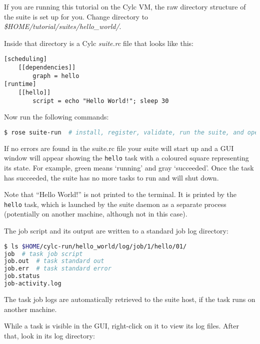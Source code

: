 \begin{shaded*}

If you are running this tutorial on the Cylc VM, the raw directory structure of the suite is set up for you. Change directory to {\em \$HOME/tutorial/suites/hello\_world/}. 

Inside that directory is a Cylc {\em suite.rc} file that looks like this:

\begin{lstlisting}[language=suiterc]
[scheduling]
    [[dependencies]]
        graph = hello
[runtime]
    [[hello]]
        script = echo "Hello World!"; sleep 30
\end{lstlisting}

Now run the following commands:

\begin{lstlisting}[language=bash]
$ rose suite-run  # install, register, validate, run the suite, and open the GUI
\end{lstlisting}

If no errors are found in the suite.rc file your suite will start up and a
GUI window will appear showing the \lstinline{hello} task with a coloured
square representing its state. For example, green means `running' and gray
`succeeded'.  Once the task has succeeded, the suite has no more tasks to run
and will shut down.

Note that ``Hello World!'' is not printed to the terminal. It is printed by 
the \lstinline=hello= task, which is launched by the suite daemon as a separate
process (potentially on another machine, although not in this case).


The job script and its output are written to a standard job log directory:

\begin{lstlisting}[language=bash]
$ ls $HOME/cylc-run/hello_world/log/job/1/hello/01/
job  # task job script
job.out  # task standard out
job.err  # task standard error
job.status
job-activity.log
\end{lstlisting}

The task job logs are automatically retrieved to the suite host, if the task
runs on another machine.

While a task is visible in the GUI, right-click on it to view its log files.
After that, look in its log directory:


\end{shaded*}
